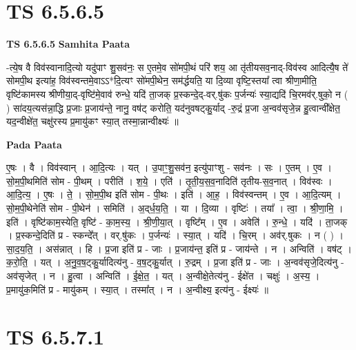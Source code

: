 \documentclass[17pt]{extarticle}
\begin{document}
\section*{ TS 6.5.6.5 }

\textbf{TS 6.5.6.5 } \newline
\textbf{Samhita Paata} \newline

-त्ये॒ष वै विव॑स्वानादि॒त्यो यदु॑पाꣳ शु॒सव॑नः॒ स ए॒तमे॒व सो॑मपी॒थं परि॑ शय॒ आ तृ॑तीयसव॒नाद्-विव॑स्व आदित्यै॒ष ते॑ सोमपी॒थ इत्या॑ह॒ विव॑स्वन्तमे॒वाऽऽ*दि॒त्यꣳ सो॑मपी॒थेन॒ सम॑र्द्धयति॒ या दि॒व्या वृष्टि॒स्तया᳚ त्वा श्रीणा॒मीति॒ वृष्टि॑कामस्य श्रीणीया॒द्-वृष्टि॑मे॒वाव॑ रुन्धे॒ यदि॑ ता॒जक् प्र॒स्कन्दे॒द्-वर्.षु॑कः प॒र्जन्यः॑ स्या॒द्यदि॑ चि॒रमव॑र्.षुको॒ न ( ) सा॑दय॒त्यस॑न्ना॒द्धि प्र॒जाः प्र॒जाय॑न्ते॒ नानु॒ वष॑ट् करोति॒ यद॑नुवषट्कु॒र्याद् -रु॒द्रं प्र॒जा अ॒न्वव॑सृजे॒न्न हु॒त्वान्वी᳚क्षेत॒ यद॒न्वीक्षे॑त॒ चक्षु॑रस्य प्र॒मायु॑कꣳ स्या॒त् तस्मा॒न्नान्वीक्ष्यः॑ ॥ \newline

\textbf{Pada Paata} \newline

ए॒षः । वै । विव॑स्वान् । आ॒दि॒त्यः । यत् । उ॒पाꣳ॒॒शु॒सव॑न॒ इत्यु॑पाꣳशु - सव॑नः । सः । ए॒तम् । ए॒व । सो॒म॒पी॒थमिति॑ सोम - पी॒थम् । परीति॑ । श॒ये॒ । एति॑ । तृ॒ती॒य॒स॒व॒नादिति॑ तृतीय-स॒व॒नात् । विव॑स्वः । आ॒दि॒त्य॒ । ए॒षः । ते॒ । सो॒म॒पी॒थ इति॑ सोम - पी॒थः । इति॑ । आ॒ह॒ । विव॑स्वन्तम् । ए॒व । आ॒दि॒त्यम् । सो॒म॒पी॒थेनेति॑ सोम - पी॒थेन॑ । समिति॑ । अ॒द्‌र्ध॒य॒ति॒ । या । दि॒व्या । वृष्टिः॑ । तया᳚ । त्वा॒ । श्री॒णा॒मि॒ । इति॑ । वृष्टि॑काम॒स्येति॒ वृष्टि॑ - का॒म॒स्य॒ । श्री॒णी॒या॒त् । वृष्टि᳚म् । ए॒व । अवेति॑ । रु॒न्धे॒ । यदि॑ । ता॒जक् । प्र॒स्कन्दे॒दिति॑ प्र - स्कन्दे᳚त् । वर्.षु॑कः । प॒र्जन्यः॑ । स्या॒त् । यदि॑ । चि॒रम् । अव॑र्.षुकः । न ( ) । सा॒द॒य॒ति॒ । अस॑न्नात् । हि । प्र॒जा इति॑ प्र - जाः । प्र॒जाय॑न्त॒ इति॑ प्र - जाय॑न्ते । न । अन्विति॑ । वष॑ट् । क॒रो॒ति॒ । यत् । अ॒नु॒व॒ष॒ट्कु॒र्यादित्य॑नु - व॒ष॒ट्कु॒र्यात् । रु॒द्रम् । प्र॒जा इति॑ प्र - जाः । अ॒न्वव॑सृजे॒दित्य॑नु - अव॑सृजेत् । न । हु॒त्वा । अन्विति॑ । ई॒क्षे॒त॒ । यत् । अ॒न्वीक्षे॒तेत्य॑नु - ईक्षे॑त । चक्षुः॑ । अ॒स्य॒ । प्र॒मायु॑क॒मिति॑ प्र - मायु॑कम् । स्या॒त् । तस्मा᳚त् । न । अ॒न्वीक्ष्य॒ इत्य॑नु - ईक्ष्यः॑ ॥  \newline




\section*{ TS 6.5.7.1 }
\end{document}
